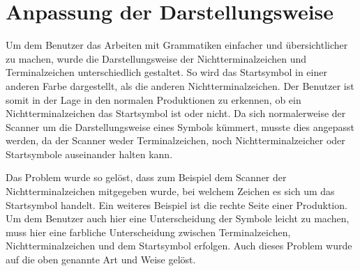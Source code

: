 \section{Anpassung der Darstellungsweise}

Um dem Benutzer das Arbeiten mit Grammatiken einfacher und übersichtlicher zu
machen, wurde die Darstellungsweise der Nichtterminalzeichen und
Terminalzeichen unterschiedlich gestaltet. So wird das Startsymbol in einer
anderen Farbe dargestellt, als die anderen Nichtterminalzeichen. Der Benutzer
ist somit in der Lage in den normalen Produktionen zu erkennen, ob ein
Nichtterminalzeichen das Startsymbol ist oder nicht. Da sich normalerweise der
Scanner um die Darstellungsweise eines Symbols kümmert, musste dies angepasst
werden, da der Scanner weder Terminalzeichen, noch Nichtterminalzeicher oder
Startsymbole auseinander halten kann.\vspace{10pt}

Das Problem wurde so gelöst, dass zum Beispiel dem Scanner der
Nichtterminalzeichen mitgegeben wurde, bei welchem Zeichen es sich um das
Startsymbol handelt. Ein weiteres Beispiel ist die rechte Seite einer
Produktion. Um dem Benutzer auch hier eine Unterscheidung der Symbole leicht zu
machen, muss hier eine farbliche Unterscheidung zwischen Terminalzeichen,
Nichtterminalzeichen und dem Startsymbol erfolgen. Auch dieses Problem wurde auf
die oben genannte Art und Weise gelöst.
